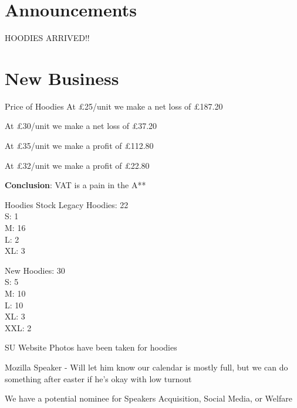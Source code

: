 \documentclass[11pt,hacksoc]{meetingmins}
\newcommand\tab[1][1cm]{\hspace*{#1}}
\begin{document}
\maketitle

\section{Announcements}
\begin{items}
\item
HOODIES ARRIVED!!

\end{items}

\section{New Business}
\begin{items}
	\item
	Price of Hoodies
		\subitem
		At \pounds25/unit we make a net loss of \pounds187.20
		
		\subitem
		At \pounds30/unit we make a net loss of \pounds37.20
		
		\subitem
		At \pounds35/unit we make a profit of \pounds112.80
		
		\subitem
		At \pounds32/unit we make a profit of \pounds22.80
		
		\subitem
		\textbf{Conclusion}: VAT is a pain in the A**
		
	\item
	Hoodies Stock
		\subitem
		Legacy Hoodies: 22 \\
		\tab[0.8cm] S: 1\\
		\tab[0.8cm] M: 16\\
		\tab[0.8cm] L: 2\\
		\tab[0.8cm] XL: 3
		
		\subitem
		New Hoodies: 30 \\
		\tab[0.8cm] S: 5\\
		\tab[0.8cm] M: 10\\
		\tab[0.8cm] L: 10\\
		\tab[0.8cm] XL: 3 \\
		\tab[0.8cm] XXL: 2
		
	\item
	SU Website Photos have been taken for hoodies
	
	\item
	
	\item
	Mozilla Speaker - Will let him know our calendar is mostly full, but we can do something after easter if he's okay with low turnout
	
	\item
	We have a potential nominee for Speakers Acquisition, Social Media, or Welfare
	
\end{items}

\vspace{1em}
\end{document}
